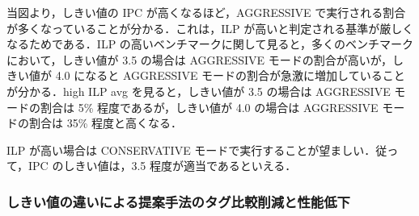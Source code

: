 当図より，しきい値の IPC が高くなるほど，AGGRESSIVE で実行される割合が多くなっていることが分かる．これは，ILP が高いと判定される基準が厳しくなるためである．ILP の高いベンチマークに関して見ると，多くのベンチマークにおいて，しきい値が 3.5 の場合は AGGRESSIVE モードの割合が高いが，しきい値が 4.0 になると AGGRESSIVE モードの割合が急激に増加していることが分かる．high ILP avg を見ると，しきい値が 3.5 の場合は AGGRESSIVE モードの割合は 5\% 程度であるが，しきい値が 4.0 の場合は AGGRESSIVE モードの割合は 35\% 程度と高くなる．

ILP が高い場合は CONSERVATIVE モードで実行することが望ましい．従って，IPC のしきい値は，3.5 程度が適当であるといえる．

\subsubsection{しきい値の違いによる提案手法のタグ比較削減と性能低下}